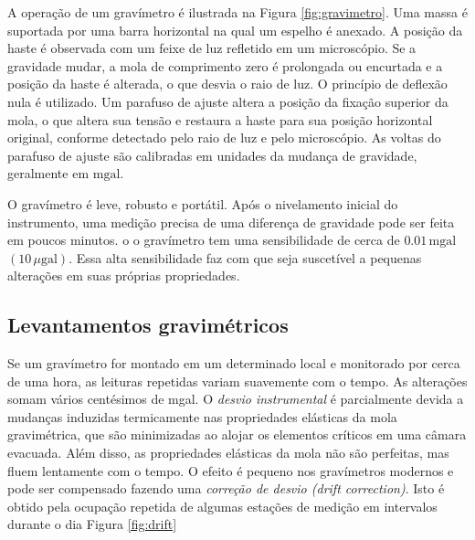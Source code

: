 \documentclass[]{book}
\theoremstyle{definition}
\theoremstyle{definition}
\theoremstyle{definition}
\theoremstyle{remark}
\begin{document}
A operação de um gravímetro é ilustrada na Figura \ref{fig:gravimetro}. Uma massa é suportada por uma barra horizontal na qual um espelho é anexado. A posição da haste é observada com um feixe de luz refletido em um microscópio. Se a gravidade mudar, a mola de comprimento zero é prolongada ou encurtada e a posição da haste é alterada, o que desvia o raio de luz. O princípio de deflexão nula é utilizado. Um parafuso de ajuste altera a posição da fixação superior da mola, o que altera sua tensão e restaura a haste para sua posição horizontal original, conforme detectado pelo raio de luz e pelo microscópio. As voltas do parafuso de ajuste são calibradas em unidades da mudança de gravidade, geralmente em \(\mathrm{mgal}\).

O gravímetro é leve, robusto e portátil. Após o nivelamento inicial do instrumento, uma medição precisa de uma diferença de gravidade pode ser feita em poucos minutos. o o gravímetro tem uma sensibilidade de cerca de \(0.01\, \mathrm{mgal}\) \((10\,\mu\mathrm{gal})\). Essa alta sensibilidade faz com que seja suscetível a pequenas alterações em suas próprias propriedades.

\hypertarget{levantamentos-gravimetricos}{%
\subsection{Levantamentos gravimétricos}\label{levantamentos-gravimetricos}}

Se um gravímetro for montado em um determinado local e monitorado por cerca de uma hora, as leituras repetidas variam suavemente com o tempo. As alterações somam vários centésimos de mgal. O \emph{desvio instrumental} é parcialmente devida a mudanças induzidas termicamente nas propriedades elásticas da mola gravimétrica, que são minimizadas ao alojar os elementos críticos em uma câmara evacuada. Além disso, as propriedades elásticas da mola não são perfeitas, mas fluem lentamente com o tempo. O efeito é pequeno nos gravímetros modernos e pode ser compensado fazendo uma \emph{correção de desvio (drift correction)}. Isto é obtido pela ocupação repetida de algumas estações de medição em intervalos durante o dia Figura \ref{fig:drift}
\end{document}
